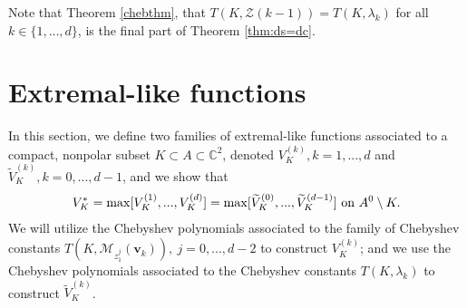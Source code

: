 \documentclass[12pt]{article}
\numberwithin{equation}{section}
\newcommand{\C}{\mathbb{C}}
\renewcommand{\tilde}{\widetilde}
\newcommand{\calM}{\mathcal{M}}
\newcommand{\calZ}{\mathcal{Z}}
\newcommand{\bv}{\mathbf{v}}
\begin{document}
Note that Theorem \ref{chebthm}, that $T(K,\calZ(k-1))=T(K,\lambda_k)$ for all $k\in\{1,\ldots,d\}$, is the final part of Theorem \ref{thm:ds=dc}.





\section{Extremal-like functions} In this section, we define two families of extremal-like functions associated to a compact, nonpolar subset $K\subset A \subset \C^2$, denoted $V_{K}^{(k)}, k=1,...,d$ and $\tilde V_{K}^{(k)}, k=0,...,d-1$, and we show that 
$$V_K^*= \max[V_{K}^{(1)},...,V_{K}^{(d)}] =\max[\tilde V_{K}^{(0)},...,\tilde V_{K}^{(d-1)}]  \ \hbox{on} \ A^0 \setminus K.$$
We will utilize the Chebyshev polynomials associated to the family of Chebyshev constants $T(K, \calM_{z_1^j}(\bv_k)), \  j=0,...,d-2$ to construct $V_{K}^{(k)}$; and we use the Chebyshev polynomials associated to the Chebyshev constants $T(K,\lambda_k)$ to construct $\tilde V_{K}^{(k)}$. 
 
\end{document}

